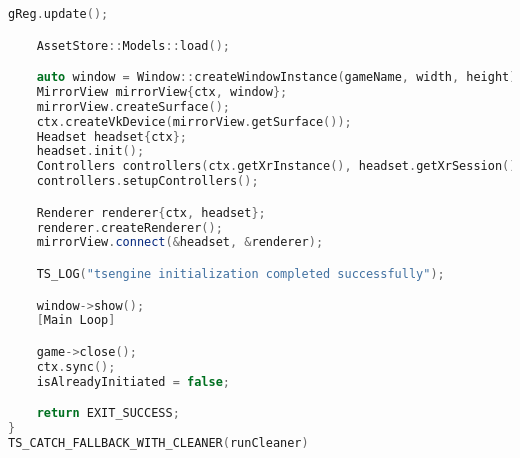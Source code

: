 \begin{lstlisting}[language=c++, caption=Engine's run function (./engine/src/core/core.cpp)]
    gReg.update();

    AssetStore::Models::load();

    auto window = Window::createWindowInstance(gameName, width, height);
    MirrorView mirrorView{ctx, window};
    mirrorView.createSurface();
    ctx.createVkDevice(mirrorView.getSurface());
    Headset headset{ctx};
    headset.init();
    Controllers controllers(ctx.getXrInstance(), headset.getXrSession());
    controllers.setupControllers();

    Renderer renderer{ctx, headset};
    renderer.createRenderer();
    mirrorView.connect(&headset, &renderer);

    TS_LOG("tsengine initialization completed successfully");

    window->show();
    [Main Loop]

    game->close();
    ctx.sync();
    isAlreadyInitiated = false;

    return EXIT_SUCCESS;
}
TS_CATCH_FALLBACK_WITH_CLEANER(runCleaner)
\end{lstlisting}

